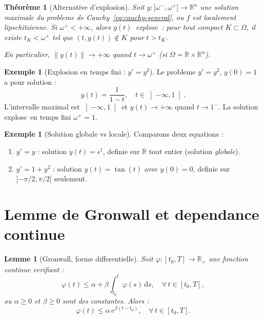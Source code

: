 \documentclass[12pt,a4paper,openany]{book}
\theoremstyle{definition}
\newtheorem{exemple}[definition]{Exemple}
\theoremstyle{plain}
\newtheorem{theoreme}[definition]{Théorème}
\newtheorem{lemme}[definition]{Lemme}
\theoremstyle{remark}
\newcommand{\R}{\mathbb{R}}
\newcommand{\dd}{\mathrm{d}}
\newcommand{\norm}[1]{\left\|#1\right\|}
\providecommand{\og}{\guillemotleft\,}
\providecommand{\fg}{\,\guillemotright}
\begin{document}
\begin{theoreme}[Alternative d'explosion]\label{thm:explosion}
Soit $y : {]}\omega^-, \omega^+{[} \to \R^n$ une solution maximale du probleme de Cauchy~\eqref{eq:cauchy-general}, ou $f$ est localement lipschitzienne. Si $\omega^+ < +\infty$, alors $y(t)$ \og{}explose\fg{} : pour tout compact $K \subset \Omega$, il existe $t_K < \omega^+$ tel que $(t, y(t)) \notin K$ pour $t > t_K$.

En particulier, $\norm{y(t)} \to +\infty$ quand $t \to \omega^+$ (si $\Omega = \R \times \R^n$).
\end{theoreme}

\begin{exemple}[Explosion en temps fini : $y' = y^2$]\label{ex:explosion-y2}
Le probleme $y' = y^2$, $y(0) = 1$ a pour solution :
\[
  y(t) = \frac{1}{1 - t}, \quad t \in \left]{-\infty}, 1\right[.
\]
L'intervalle maximal est $\left]{-\infty}, 1\right[$ et $y(t) \to +\infty$ quand $t \to 1^-$. La solution \og{}explose\fg{} en temps fini $\omega^+ = 1$.
\end{exemple}

\begin{exemple}[Solution globale vs locale]\label{ex:global-vs-local}
Comparons deux equations :
\begin{enumerate}[label=(\alph*)]
  \item $y' = y$ : solution $y(t) = e^t$, definie sur $\R$ tout entier (solution \emph{globale}).
  \item $y' = 1 + y^2$ : solution $y(t) = \tan(t)$ avec $y(0) = 0$, definie sur ${]}{-\pi/2}, \pi/2{[}$ seulement.
\end{enumerate}
\end{exemple}

\section{Lemme de Gronwall et dependance continue}\label{sec:gronwall}

\begin{lemme}[Gronwall, forme differentielle]\label{thm:gronwall}
Soit $\varphi : [t_0, T] \to \R_+$ une fonction continue verifiant :
\[
  \varphi(t) \leq \alpha + \beta \int_{t_0}^{t} \varphi(s)\, \dd s, \quad \forall\, t \in [t_0, T],
\]
ou $\alpha \geq 0$ et $\beta \geq 0$ sont des constantes. Alors :
\begin{equation}\label{eq:gronwall}
  \varphi(t) \leq \alpha \, e^{\beta(t - t_0)}, \quad \forall\, t \in [t_0, T].
\end{equation}
\end{lemme}
\end{document}
